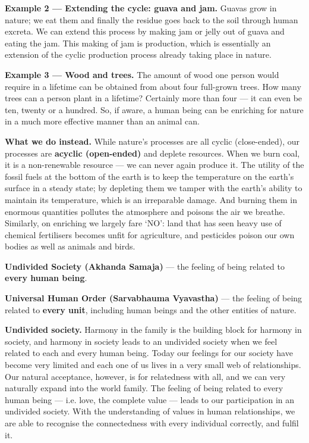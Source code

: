\textbf{Example 2 --- Extending the cycle: guava and jam.} Guavas grow in
nature; we eat them and finally the residue goes back to the soil through
human excreta. We can extend this process by making jam or jelly out of guava
and eating the jam. This making of jam is production, which is essentially an
extension of the cyclic production process already taking place in nature.

\textbf{Example 3 --- Wood and trees.} The amount of wood one person would
require in a lifetime can be obtained from about four full-grown trees. How
many trees can a person plant in a lifetime? Certainly more than four --- it
can even be ten, twenty or a hundred. So, if aware, a human being can be
enriching for nature in a much more effective manner than an animal can.

\textbf{What we do instead.} While nature's processes are all cyclic
(close-ended), our processes are \textbf{acyclic (open-ended)} and deplete
resources. When we burn coal, it is a non-renewable resource --- we can never
again produce it. The utility of the fossil fuels at the bottom of the earth
is to keep the temperature on the earth's surface in a steady state; by
depleting them we tamper with the earth's ability to maintain its temperature,
which is an irreparable damage. And burning them in enormous quantities
pollutes the atmosphere and poisons the air we breathe. Similarly, on
enriching we largely fare `NO': land that has seen heavy use of chemical
fertilisers becomes unfit for agriculture, and pesticides poison our own
bodies as well as animals and birds.


\ans
\begin{abul}
\item \textbf{Undivided Society (Akhanda Samaja)} --- the feeling of being
      related to \textbf{every human being}.
\item \textbf{Universal Human Order (Sarvabhauma Vyavastha)} --- the feeling
      of being related to \textbf{every unit}, including human beings and the
      other entities of nature.
\end{abul}

\textbf{Undivided society.} Harmony in the family is the building block for
harmony in society, and harmony in society leads to an undivided society when
we feel related to each and every human being. Today our feelings for our
society have become very limited and each one of us lives in a very small web
of relationships. Our natural acceptance, however, is for relatedness with
all, and we can very naturally expand into the world family. The feeling of
being related to every human being --- i.e. love, the complete value --- leads
to our participation in an undivided society. With the understanding of values
in human relationships, we are able to recognise the connectedness with every
individual correctly, and fulfil it.

